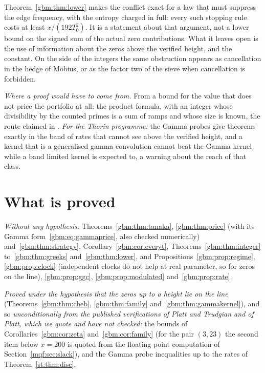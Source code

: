 Theorem~\ref{gbm:thm:lower} makes the conflict exact for a law that must suppress the edge frequency, with the entropy charged in full: every such stopping rule costs at least $x/(192T_0^2)$. It is a statement about that argument, not a lower bound on the signed sum of the actual zero contributions. What it leaves open is the use of information about the zeros above the verified height, and the constant. On the side of the integers the same obstruction appears as cancellation in the hedge of M\"obius, or as the factor two of the sieve when cancellation is forbidden.

\emph{Where a proof would have to come from.} From a bound for the value that does not price the portfolio at all: the product formula, with an integer whose divisibility by the counted primes is a sum of ramps and whose size is known, the route claimed in \cite{Rub26}. \emph{For the Thorin programme:} the Gamma probes give theorems exactly in the band of rates that cannot see above the verified height, and a kernel that is a generalised gamma convolution cannot beat the Gamma kernel while a band limited kernel is expected to, a warning about the reach of that class.

\section{What is proved}\label{gbm:sec:proved}

\emph{Without any hypothesis:} Theorems~\ref{gbm:thm:tanaka}, \ref{gbm:thm:price} (with its Gamma form~\eqref{gbm:eq:gammaprice}, also checked numerically) and~\ref{gbm:thm:strategy}, Corollary~\ref{gbm:cor:everyt}, Theorems~\ref{gbm:thm:integer} to~\ref{gbm:thm:greeks} and~\ref{gbm:thm:lower}, and Propositions~\ref{gbm:prop:regime}, \ref{gbm:prop:clock} (independent clocks do not help at real parameter, so for zeros on the line), \ref{gbm:prop:ggc}, \ref{gbm:prop:modulated} and~\ref{gbm:prop:rate}.

\emph{Proved under the hypothesis that the zeros up to a height lie on the line} (Theorems~\ref{gbm:thm:cheb}, \ref{gbm:thm:family} and~\ref{gbm:thm:gammakernel}), and so \emph{unconditionally from the published verifications of Platt and Trudgian and of Platt, which we quote and have not checked:} the bounds of Corollaries~\ref{gbm:cor:zeta} and~\ref{gbm:cor:family} (for the pair $(3,23)$ the second item below $x=200$ is quoted from the floating point computation of Section~\ref{mqf:sec:slack}), and the Gamma probe inequalities up to the rates of Theorem~\ref{st:thm:disc}.

